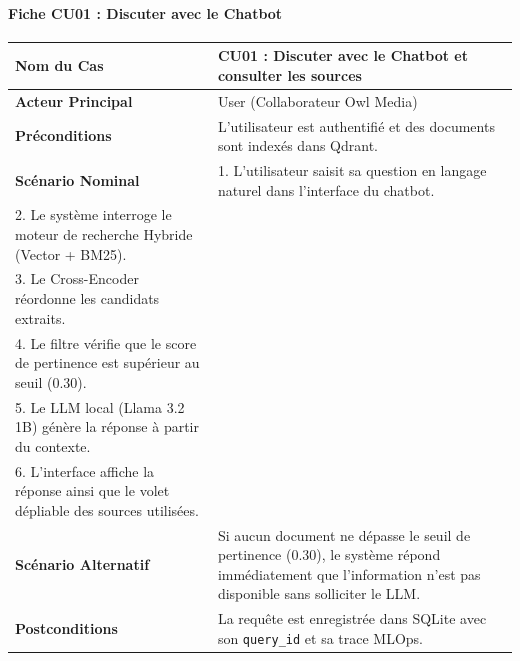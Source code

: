 \paragraph{Fiche CU01 : Discuter avec le Chatbot}
\begin{table}[htbp]
\centering
\small
\begin{tabular}{|p{3.2cm}|p{10.3cm}|}
\hline
\textbf{Nom du Cas} & \textbf{CU01 : Discuter avec le Chatbot et consulter les sources} \\ \hline
\textbf{Acteur Principal} & User (Collaborateur Owl Media) \\ \hline
\textbf{Préconditions} & L'utilisateur est authentifié et des documents sont indexés dans Qdrant. \\ \hline
\textbf{Scénario Nominal} & 
1. L'utilisateur saisit sa question en langage naturel dans l'interface du chatbot.\\
2. Le système interroge le moteur de recherche Hybride (Vector + BM25).\\
3. Le Cross-Encoder réordonne les candidats extraits.\\
4. Le filtre vérifie que le score de pertinence est supérieur au seuil ($0.30$).\\
5. Le LLM local (Llama 3.2 1B) génère la réponse à partir du contexte.\\
6. L'interface affiche la réponse ainsi que le volet dépliable des sources utilisées. \\ \hline
\textbf{Scénario Alternatif} & Si aucun document ne dépasse le seuil de pertinence ($0.30$), le système répond immédiatement que l'information n'est pas disponible sans solliciter le LLM. \\ \hline
\textbf{Postconditions} & La requête est enregistrée dans SQLite avec son \texttt{query\_id} et sa trace MLOps. \\ \hline
\end{tabular}
\end{table}

